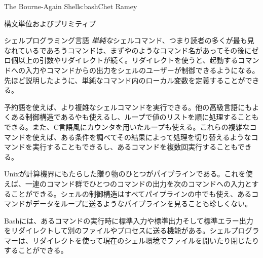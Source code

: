 \begin{aosachapter}{The Bourne-Again Shell}{s:bash}{Chet Ramey}
\begin{aosasect1}{構文単位およびプリミティブ}
\begin{aosasect2}{シェルプログラミング言語}
\emph{単純な}シェルコマンド、つまり読者の多くが最も見なれているであろうコマンドは、まずやのようなコマンド名があってその後にゼロ個以上の引数やリダイレクトが続く。リダイレクトを使うと、起動するコマンドへの入力やコマンドからの出力をシェルのユーザーが制御できるようになる。先ほど説明したように、単純なコマンド内のローカル変数を定義することができる。

予約語を使えば、より複雑なシェルコマンドを実行できる。他の高級言語にもよくある制御構造であるやも使えるし、ループで値のリストを順に処理することもできる。また、C言語風にカウンタを用いたループも使える。これらの複雑なコマンドを使えば、ある条件を調べてその結果によって処理を切り替えるようなコマンドを実行することもできるし、あるコマンドを複数回実行することもできる。

Unixが計算機界にもたらした贈り物のひとつがパイプラインである。これを使えば、一連のコマンド群でひとつのコマンドの出力を次のコマンドへの入力とすることができる。シェルの制御構造はすべてパイプラインの中でも使え、あるコマンドがデータをループに送るようなパイプラインを見ることも珍しくない。

Bashには、あるコマンドの実行時に標準入力や標準出力そして標準エラー出力をリダイレクトして別のファイルやプロセスに送る機能がある。シェルプログラマーは、リダイレクトを使って現在のシェル環境でファイルを開いたり閉じたりすることができる。


\end{aosasect2}
\end{aosasect1}
\end{aosachapter}
